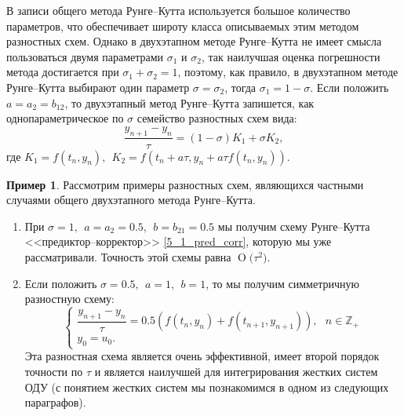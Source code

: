 \documentclass[11pt,a4paper,twoside,listtotoc,bibtotoc]{report}
\numberwithin{equation}{section}
\theoremstyle{definition}
\newtheorem*{example*}{Пример}
\theoremstyle{plain}
\newcommand{\bigO}[1]{\ensuremath{\operatorname{O}\bigl(#1\bigr)}}
\begin{document}
В записи общего метода Рунге--Кутта используется большое количество
параметров, что обеспечивает широту класса описываемых этим методом
разностных схем. Однако в двухэтапном методе Рунге--Кутта не имеет смысла
пользоваться двумя параметрами $\sigma_1$ и $\sigma_2$, так наилучшая оценка
погрешности метода достигается при $\sigma_1 + \sigma_2 = 1$, поэтому,
как правило, в двухэтапном методе Рунге--Кутта выбирают один параметр
$\sigma = \sigma_2$, тогда $\sigma_1 = 1 - \sigma$. Если положить
$a = a_2 = b_{12}$, то двухэтапный метод Рунге--Кутта запишется, как
однопараметрическое по $\sigma$ семейство разностных схем вида:
%
$$
    \dfrac{y_{n+1} - y_n}{\tau} = (1 - \sigma)K_1 + \sigma K_2,
$$
%
где $K_1 = f(t_n, y_n),~~K_2 = f(t_n + a\tau, y_n + a\tau f(t_n, y_n))$.

%
\begin{example*}
%
    Рассмотрим примеры разностных схем, являющихся частными случаями
    общего двухэтапного метода Рунге--Кутта.
    \begin{enumerate}
        \item При $\sigma=1,~~a=a_2=0.5,~~b=b_{21}=0.5$ мы получим схему Рунге--Кутта
        <<предиктор--корректор>> \eqref{5_1_pred_corr}, которую мы уже рассматривали.
        Точность этой схемы равна $\bigO{\tau^2}$.

        \item Если положить $\sigma=0.5,~~a=1,~~b=1$, то мы получим симметричную разностную схему:
        \begin{equation}
            \label{simm_scheme}
            \begin{cases}
                \dfrac{y_{n+1} - y_n}{\tau} = 0.5 \left(f(t_n, y_n) +
                f(t_{n+1}, y_{n+1})\right),~~~n\in\mathbb{Z}_+ \\
                y_0 = u_0.
            \end{cases}
        \end{equation}
        Эта разностная схема является очень эффективной,
        имеет второй порядок точности по $\tau$ и является наилучшей
        для интегрирования жестких систем ОДУ (с понятием жестких систем
        мы познакомимся в одном из следующих параграфов).
    \end{enumerate}
\end{example*}
%
\end{document}
